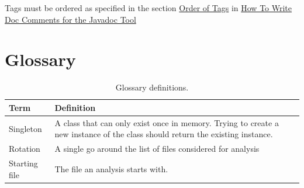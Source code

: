 \documentclass[11pt]{article} %
\begin{document}
    Tags must be ordered as specified in the section \href{https://www.oracle.com/technical-resources/articles/java/javadoc-tool.html#orderoftags}{Order of Tags} in \href{https://www.oracle.com/technical-resources/articles/java/javadoc-tool.html}{How To Write Doc Comments for the Javadoc Tool}

    \newpage



    \section{Glossary}

    \begin{table}[H]
        \centering
        \begin{tabular}{p{.3\linewidth} | p{.6\linewidth}}
            \textbf{Term} & \textbf{Definition}
            \\\hline
            Singleton & A class that can only exist once in memory. Trying to create a new instance of the class
            should return the existing instance. \\\hline
            Rotation      & A single go around the list of files considered for analysis \\\hline
            Starting file & The file an analysis starts with.
        \end{tabular}
        \caption{Glossary definitions.}
        \label{tab:glossary}
    \end{table}
    \printbibliography[heading=bibintoc]
    \listoffigures
    \listoftables
\end{document}
